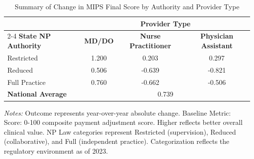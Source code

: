 \begin{table}[htbp]
    \centering
    \caption{Summary of Change in MIPS Final Score by Authority and Provider Type}
    \label{tab:d_mips_final_score_provtype}
    \vspace{0.2cm}
    \begin{tabular}{lccc}
        \toprule
        & \multicolumn{3}{c}{\textbf{Provider Type}} \\
        \cmidrule(lr){2-4}
        \textbf{State NP Authority} & \textbf{MD/DO} & \textbf{Nurse Practitioner} & \textbf{Physician Assistant} \\
        \midrule
        Restricted & 1.200 & 0.203 & 0.297 \\
        Reduced & 0.506 & -0.639 & -0.821 \\
        Full Practice & 0.760 & -0.662 & -0.506 \\
        \midrule
        \textbf{National Average} & \multicolumn{3}{c}{0.739} \\
        \bottomrule
    \end{tabular}
    \vspace{0.1cm}
    \begin{minipage}{0.85\textwidth}
        \footnotesize \textit{Notes:} Outcome represents year-over-year absolute change. Baseline Metric: Score: 0-100 composite payment adjustment score. Higher reflects better overall clinical value. NP Law categories represent Restricted (supervision), Reduced (collaborative), and Full (independent practice). Categorization reflects the regulatory environment as of 2023.
    \end{minipage}
\end{table}
